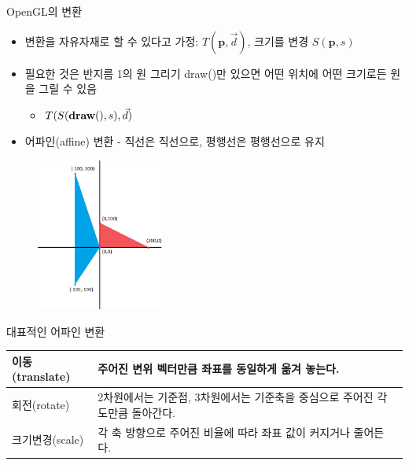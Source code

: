 \documentclass{beamer}
\begin{document}
\begin{frame}[fragile]{OpenGL의 변환}

\begin{itemize}
\item 변환을 자유자재로 할 수 있다고 가정: $T( \mathbf p , \vec{d})$, 크기를 변경 $S( \mathbf p , s)$
\item 필요한 것은 반지름 1의 원 그리기 draw()만 있으면 어떤 위치에 어떤 크기로든 원을 그릴 수 있음
	\begin{itemize}
	\item $T ( S({\bf draw()}, s),  \vec{d})$
	\end{itemize}
\end{itemize}


\begin{itemize}
\item 어파인(affine) 변환 - 직선은 직선으로, 평행선은 평행선으로 유지
\end{itemize}

\begin{figure}
    \includegraphics[height=5cm]{OGL_transform/affineXform.png}
\end{figure}

\end{frame}

\begin{frame}[fragile]{대표적인 어파인 변환}

\begin{table}
\label{tab:transform:affineXforms}
\begin{center}
    \begin{tabular}{ |l| p{7cm} |}
    \hline
    {이동(translate)} & {주어진 변위 벡터만큼 좌표를 동일하게 옮겨 놓는다.} \\[2em] \hline
    {회전(rotate)} & {2차원에서는 기준점, 3차원에서는 기준축을 중심으로 주어진 각도만큼 돌아간다.}\\[2em] \hline
    {크기변경(scale)} & {각 축 방향으로 주어진 비율에 따라 좌표 값이 커지거나 줄어든다.}\\[2em] \hline
    \hline
    \end{tabular}
\end{center}
\end{table}
\end{frame}
\end{document}
